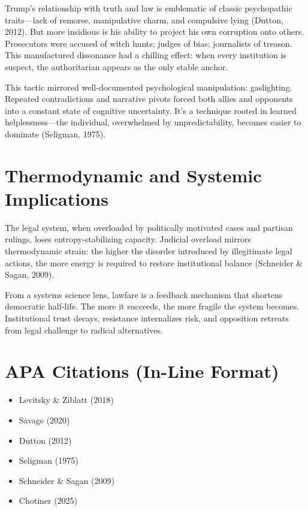 Trump's relationship with truth and law is emblematic of classic
psychopathic traits---lack of remorse, manipulative charm, and
compulsive lying (Dutton, 2012). But more insidious is his ability to
project his own corruption onto others. Prosecutors were accused of
witch hunts; judges of bias; journalists of treason. This manufactured
dissonance had a chilling effect: when every institution is suspect, the
authoritarian appears as the only stable anchor.

This tactic mirrored well-documented psychological manipulation:
gaslighting. Repeated contradictions and narrative pivots forced both
allies and opponents into a constant state of cognitive uncertainty.
It's a technique rooted in learned helplessness---the individual,
overwhelmed by unpredictability, becomes easier to dominate (Seligman,
1975).

\section*{Thermodynamic and Systemic Implications}

The legal system, when overloaded by politically motivated cases and
partisan rulings, loses entropy-stabilizing capacity. Judicial overload
mirrors thermodynamic strain: the higher the disorder introduced by
illegitimate legal actions, the more energy is required to restore
institutional balance (Schneider \& Sagan, 2009).

From a systems science lens, lawfare is a feedback mechanism that
shortens democratic half-life. The more it succeeds, the more fragile
the system becomes. Institutional trust decays, resistance internalizes
risk, and opposition retreats from legal challenge to radical
alternatives.

\section*{APA Citations (In-Line Format)}

\begin{itemize}
\tightlist
\item
  Levitsky \& Ziblatt (2018)
\item
  Savage (2020)
\item
  Dutton (2012)
\item
  Seligman (1975)
\item
  Schneider \& Sagan (2009)
\item
  Chotiner (2025)
\end{itemize}

